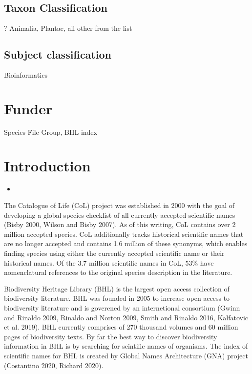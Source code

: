 \documentclass[
]{article}
\providecommand{\tightlist}{%
  \setlength{\itemsep}{0pt}\setlength{\parskip}{0pt}}
\begin{document}
\hypertarget{taxon-classification}{%
\subsection{Taxon Classification}\label{taxon-classification}}

? Animalia, Plantae, all other from the list

\hypertarget{subject-classification}{%
\subsection{Subject classification}\label{subject-classification}}

Bioinformatics

\hypertarget{funder}{%
\section{Funder}\label{funder}}

Species File Group, BHL index

\hypertarget{introduction}{%
\section{Introduction}\label{introduction}}

\begin{itemize}
\item
\end{itemize}

The Catalogue of Life (CoL) project was established in 2000 with the
goal of developing a global species checklist of all currently accepted
scientific names (Bisby 2000, Wilson and Bisby 2007). As of this
writing, CoL contains over 2 million accepted species. CoL additionally
tracks historical scientific names that are no longer accepted and
contains 1.6 million of these synonyms, which enables finding species
using either the currently accepted scientific name or their historical
names. Of the 3.7 million scientific names in CoL, 53\% have
nomenclatural references to the original species description in the
literature.

Biodiversity Heritage Library (BHL) is the largest open access
collection of biodiversity literature. BHL was founded in 2005 to
increase open access to biodiversity literature and is goverened by an
internetional consortium (Gwinn and Rinaldo 2009, Rinaldo and Norton
2009, Smith and Rinaldo 2016, Kalfatovic et al. 2019). BHL currently
comprises of 270 thousand volumes and 60 million pages of biodiversity
texts. By far the best way to discover biodiversity information in BHL
is by searching for scintific names of organisms. The index of
scientific names for BHL is created by Global Names Architecture (GNA)
project (Costantino 2020, Richard 2020).
\end{document}
